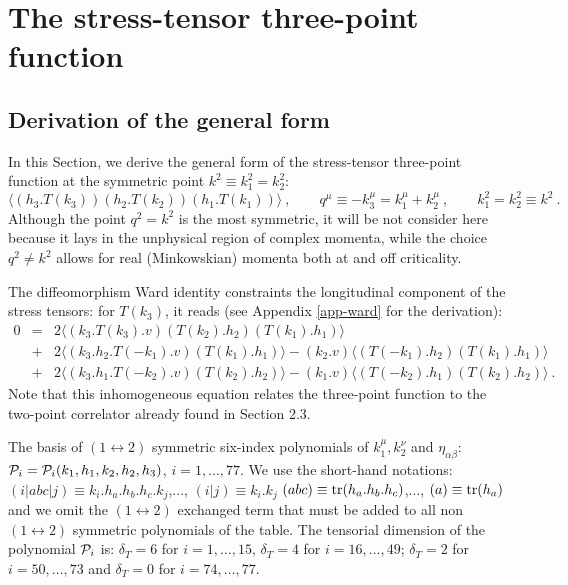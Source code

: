 \documentclass[11pt]{article}
\newcommand{\beq}{\begin{equation}}
\newcommand{\eeq}{\end{equation}}
\newcommand{\bea}{\begin{eqnarray}}
\newcommand{\eea}{\end{eqnarray}}
\def\a{\alpha}
\def\b{\beta}
\def\nl{\nonumber\\}
\def\bra{\langle}
\def\ket{\rangle}
\def\dt{{\delta_T}} %
\begin{document}
 
 
\section{The stress-tensor three-point function} 
 

\subsection{Derivation of the general form} 
 
In this Section, we derive the general form of the  
stress-tensor three-point function at the symmetric point
$k^2\equiv k^2_1=k^2_2$:  
\beq\label{3p} 
 \bra \left(h_3. T(k_3) \right)  
\left(h_2. T(k_2) \right) \left(h_1. T(k_1) \right)\ket \ , 
 \qquad q^\mu\equiv -k_3^\mu=k_1^\mu + k_2^\mu\ ,  
\qquad k^2_1=k^2_2\equiv k^2\ . 
\eeq 
Although the point $q^2=k^2$ is the most symmetric, it will be not 
consider here because it lays in the unphysical region 
of complex momenta, while the choice $q^2 \neq k^2$ allows
for real (Minkowskian) momenta both at and off criticality. 
 
The diffeomorphism Ward identity constraints the longitudinal component
of the stress tensors: for $T(k_3)$,  it reads 
(see Appendix \ref{app-ward} for the derivation):
\bea\label{3p-diff} 
 0 & = & 
2 \bra (k_3.T(k_3).v)(T(k_2).h_2)(T(k_1).h_1) \ket  \nl  
 & + & 2 \bra (k_3.h_2.T(-k_1).v)(T(k_1).h_1) \ket  
- (k_2.v) \bra (T(-k_1).h_2)(T(k_1).h_1) \ket  \nl  
& + & 2 \bra (k_3.h_1.T(-k_2).v)(T(k_2).h_2) \ket  
- (k_1.v) \bra (T(-k_2).h_1)(T(k_2).h_2) \ket \ .  
\eea 
Note that this inhomogeneous equation relates the three-point function
to the two-point correlator already found in Section 2.3. 



\begin{table}
\begin{center}

\caption{The basis of $(1\leftrightarrow 2)$ symmetric six-index polynomials
of $k_1^\mu,k_2^\nu$ and $\eta_{\a\b}$:
${\cal P}_i={\cal P}_i(k_1,h_1,k_2,h_2,h_3)$, $i=1,\dots,77$.
 We use the short-hand notations:
 $(i|abc|j)\equiv k_i.h_a.h_b.h_c.k_j$,...,
 $(i|j)\equiv k_i.k_j$
 $(abc)\equiv {\rm tr} (h_a.h_b.h_c)$,...,
 $(a)\equiv {\rm tr} (h_a)$
 and we omit the $(1\leftrightarrow 2)$
 exchanged term that must be added to all
 non $(1\leftrightarrow 2)$ symmetric polynomials of the table.
The tensorial dimension of the polynomial ${\cal P}_i$ is:
$\dt=6$ for $i=1,\dots,15$, $\dt=4$ for $i=16,\dots,49$; 
$\dt=2$ for $i=50,\dots,73$ and $\dt=0$ for $i=74,\dots,77$. }
\label{t_base}
\end{center}
\end{table}
\end{document}
